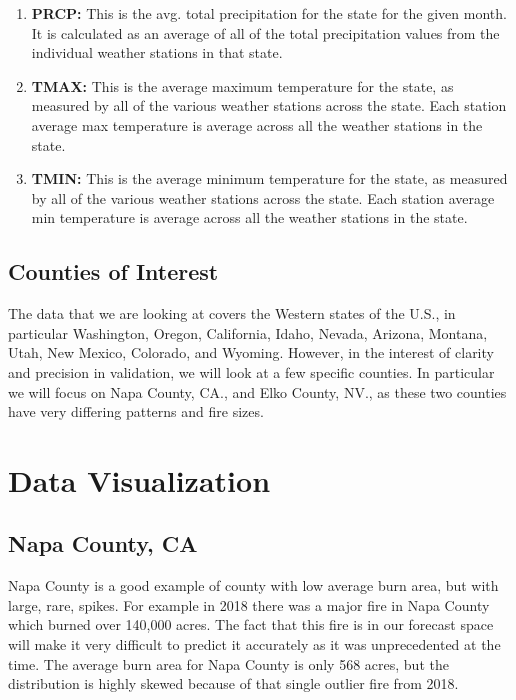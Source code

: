 \documentclass[12pt]{article}
\begin{document}
\begin{enumerate}
\item \textbf{PRCP:} This is the avg. total precipitation for the state for the given month. It is calculated as an average of all of the total precipitation values from the individual weather stations in that state. 

\item \textbf{TMAX:} This is the average maximum temperature for the state, as measured by all of the various weather stations across the state. Each station average max temperature is average across all the weather stations in the state. 

\item \textbf{TMIN:} This is the average minimum temperature for the state, as measured by all of the various weather stations across the state. Each station average min temperature is average across all the weather stations in the state. 

\end{enumerate}

\subsection{\textrm{Counties of Interest}}

The data that we are looking at covers the Western states of the U.S., in particular Washington, Oregon, California, Idaho, Nevada, Arizona, Montana, Utah, New Mexico, Colorado, and Wyoming. However, in the interest of clarity and precision in validation, we will look at a few specific counties. In particular we will focus on Napa County, CA., and Elko County, NV., as these two counties have very differing patterns and fire sizes. 

\section{\textrm{Data Visualization}}

\subsection{\textrm{Napa County, CA}}

Napa County is a good example of county with low average burn area, but with large, rare, spikes. For example in 2018 there was a major fire in Napa County which burned over 140,000 acres. The fact that this fire is in our forecast space will make it very difficult to predict it accurately as it was unprecedented at the time. The average burn area for Napa County is only 568 acres, but the distribution is highly skewed because of that single outlier fire from 2018. \\[0.1in]
\end{document}
